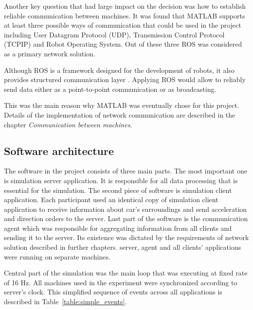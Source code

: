 \documentclass[11pt,english]{article}
\begin{document}
\par

Another key question that had large impact on the decision was how to establish reliable communication between machines. It was found that MATLAB supports at least three possible ways of communication that could be used in the project including User Datagram Protocol (UDP), Transmission Control Protocol (TCPIP) and Robot Operating System. Out of these three ROS was considered as a primary network solution.

\par
Although ROS is a framework designed for the development of robots, it also provides structured communication layer \citep{quigley2009ros}. Applying ROS would allow to reliably send data either as a point-to-point communication or as broadcasting.

\par
 This was the main reason why MATLAB was eventually chose for this project.
Details of the implementation of network communication are described in the chapter \textit{Communication between machines}.




\subsection{Software architecture}

The software in the project consists of three  main parts. The most important one is simulation server application. It is responsible for all data processing that is essential for the simulation. The second piece of software is simulation client application. Each participant used an identical copy of simulation client application to receive information about car's surroundings and send acceleration and direction orders to the server. Last part of the software is the communication agent which was responsible for aggregating information from all clients and sending it to the server. Its existence was dictated by the requirements of network solution described in further chapters. server, agent and all clients' applications were running on separate machines.
\par
Central part of the simulation was the main loop that was executing at fixed rate of 16 Hz. All machines used in the experiment were synchronized according to server's clock. This simplified sequence of events across all applications is described in Table~\ref{table:simple_events}.

\par
\end{document}
